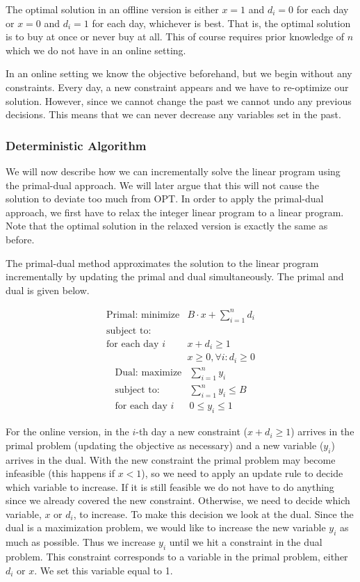 The optimal solution in an offline version is either $x=1$ and $d_i = 0$ for each day or $x=0$ and $d_i = 1$ for each day, whichever is best.
That is, the optimal solution is to buy at once or never buy at all.
This of course requires prior knowledge of $n$ which we do not have in an online setting.

In an online setting we know the objective beforehand, but we begin without any constraints.
Every day, a new constraint appears and we have to re-optimize our solution.
However, since we cannot change the past we cannot undo any previous decisions.
This means that we can never decrease any variables set in the past.

\subsubsection{Deterministic Algorithm}

We will now describe how we can incrementally solve the linear program using the primal-dual approach.
We will later argue that this will not cause the solution to deviate too much from OPT.
In order to apply the primal-dual approach, we first have to relax the integer linear program to a linear program. Note that the optimal solution in the relaxed version is exactly the same as before.

The primal-dual method approximates the solution to the linear program incrementally by updating the primal and dual simultaneously.
The primal and dual is given below.

\[
	\begin{array}{lr}
	\textrm{Primal: minimize}   & B\cdot x + \sum^n_{i=1} d_i   \\
	\textrm{subject to:} & \\
	\textrm{for each day $i$} & x + d_i  \ge 1  \\
			    & x     \geq 0, \forall i : d_i \ge 0
	\end{array}
\]
\[
	\begin{array}{lr}
	\textrm{Dual: maximize}   & \sum^n_{i=1} y_i   \\
	\textrm{subject to:} & \sum^n_{i=1} y_i \le B \\
	\textrm{for each day $i$} & 0 \le y_i  \le 1
	\end{array}
\]

For the online version, in the $i$-th day a new constraint ($x + d_i  \ge 1$) arrives in the primal problem (updating the objective as necessary) and a new variable ($y_i$) arrives in the dual.
With the new constraint the primal problem may become infeasible (this happens if $x < 1$), so we need to apply an update rule to decide which variable to increase.
If it is still feasible we do not have to do anything since we already covered the new constraint. 
Otherwise, we need to decide which variable, $x$ or $d_i$, to increase. 
To make this decision we look at the dual. 
Since the dual is a maximization problem, we would like to increase the new variable $y_i$ as much as possible.
Thus we increase $y_i$ until we hit a constraint in the dual problem.
This constraint corresponds to a variable in the primal problem, either $d_i$ or $x$.
We set this variable equal to 1.

